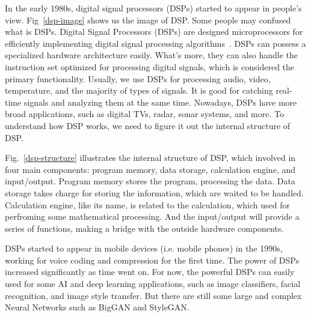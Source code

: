 \documentclass{article}
\begin{document}
In the early 1980s, digital signal processors (DSPs) started to appear in people’s view. Fig~\ref{dsp-image} shows us the image of DSP. Some people may confused what is DSPs. Digital Signal Processors (DSPs) are designed microprocessors for efficiently implementing digital signal processing algorithms~\cite{utmel2020dsp}. DSPs can possess a specialized hardware architecture easily. What's more, they can also handle the instruction set optimized for processing digital signals, which is considered the primary functionality. Usually, we use DSPs for processing audio, video, temperature, and the majority of types of signals. It is good for catching real-time signals and analyzing them at the same time. Nowadays, DSPs have more broad applications, such as digital TVs, radar, sonar systems, and more. To understand how DSP works, we need to figure it out the internal structure of DSP. 


	

Fig.~\ref{dsp-structure} illustrates the internal structure of DSP, which involved in four main components: program memory, data storage, calculation engine, and input/output. Program memory stores the program, processing the data. Data storage takes charge for storing the information, which are waited to be handled. Calculation engine, like its name, is related to the calculation, which used for perfroming some mathematical processing. And the input/output will provide a series of functions, making a bridge with the outside hardware components.


DSPs started to appear in mobile devices (i.e. mobile phones) in the 1990s, working for voice coding and compression for the first time. The power of DSPs increased significantly as time went on. For now, the powerful DSPs can easily used for some AI and deep learning applications, such as image classifiers, facial recognition, and image style transfer. But there are still some large and complex Neural Networks such as BigGAN and StyleGAN.
\end{document}
